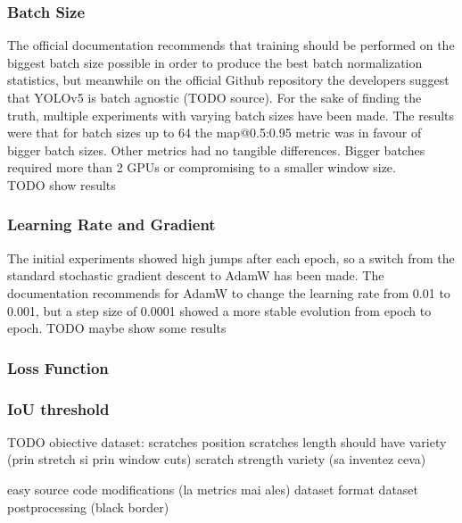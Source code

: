 \subsubsection{Batch Size}
The official documentation recommends that training should be performed on the biggest batch size possible in order to produce the best batch normalization statistics, but meanwhile on the official Github repository the developers suggest that YOLOv5 is batch agnostic (TODO source). For the sake of finding the truth, multiple experiments with varying batch sizes have been made. The results were that for batch sizes up to 64 the map@0.5:0.95 metric was in favour of bigger batch sizes. Other metrics had no tangible differences. Bigger batches required more than 2 GPUs or compromising to a smaller window size. \\
TODO show results \\

\subsubsection{Learning Rate and Gradient}
The initial experiments showed high jumps after each epoch, so a switch from the standard stochastic gradient descent to AdamW has been made. The documentation recommends for AdamW to change the learning rate from 0.01 to 0.001, but a step size of 0.0001 showed a more stable evolution from epoch to epoch.
TODO maybe show some results

\subsubsection{Loss Function}


\subsubsection{IoU threshold}


TODO obiective dataset:
scratches position
scratches length should have variety (prin stretch si prin window cuts)
scratch strength variety (sa inventez ceva)

easy source code modifications (la metrics mai ales)
dataset format
dataset postprocessing (black border)
